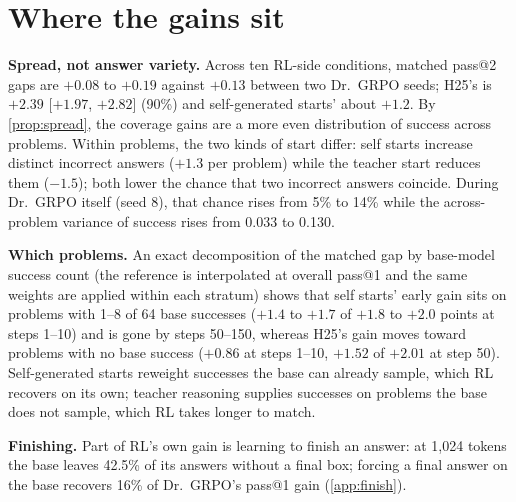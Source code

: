 \documentclass{article}
\theoremstyle{plain}
\begin{document}
\section{Where the gains sit}\label{sec:where}
\textbf{Spread, not answer variety.} Across ten RL-side conditions, matched pass@2 gaps are $+0.08$ to $+0.19$ against
$+0.13$ between two Dr.\ GRPO seeds; H25's is $+2.39$ [$+1.97$, $+2.82$] (90\%) and self-generated starts' about
$+1.2$. By \cref{prop:spread}, the coverage gains are a more even distribution of success across problems. Within
problems, the two kinds of start differ: self starts increase distinct incorrect answers ($+1.3$ per problem) while the
teacher start reduces them ($-1.5$); both lower the chance that two incorrect answers coincide. During Dr.\ GRPO itself
(seed 8), that chance rises from 5\% to 14\% while the across-problem variance of success rises from 0.033 to 0.130.

\textbf{Which problems.} An exact decomposition of the matched gap by base-model success count (the reference is
interpolated at overall pass@1 and the same weights are applied within each stratum) shows that self starts' early
gain sits on problems with 1--8 of 64 base successes ($+1.4$ to $+1.7$ of $+1.8$ to $+2.0$ points at steps 1--10) and
is gone by steps 50--150, whereas H25's gain moves toward problems with no base success ($+0.86$ at steps 1--10,
$+1.52$ of $+2.01$ at step 50). Self-generated starts reweight successes the base can already sample, which RL
recovers on its own; teacher reasoning supplies successes on problems the base does not sample, which RL takes longer
to match.

\textbf{Finishing.} Part of RL's own gain is learning to finish an answer: at 1,024 tokens the base leaves 42.5\% of
its answers without a final box; forcing a final answer on the base recovers 16\% of Dr.\ GRPO's pass@1 gain
(\cref{app:finish}).
\end{document}
